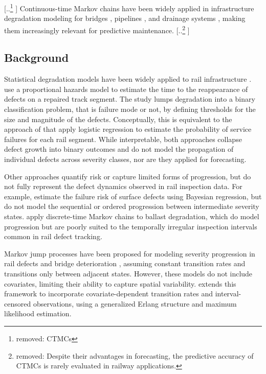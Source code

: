 \documentclass{article}
\providecommand{\DIFadd}[1]{{\protect\color{blue} \sf #1}} %
\providecommand{\DIFdel}[1]{{\protect\color{red} [..\footnote{removed: #1} ]}} %
\providecommand{\DIFaddbegin}{} %
\providecommand{\DIFaddend}{} %
\providecommand{\DIFdelbegin}{} %
\providecommand{\DIFdelend}{} %
\begin{document}
\DIFdelbegin \DIFdel{CTMCs }\DIFdelend \DIFaddbegin \DIFadd{Continuous-time Markov chains }\DIFaddend have been widely applied in infrastructure degradation modeling for bridges \citep{Mizutani2023RegimeSwitching}, pipelines \citep{JimenezRoa2024Nonhomogeneous}, and drainage systems \citep{Wu2021ConditionPrediction}, making them increasingly relevant for predictive maintenance. \DIFdelbegin \DIFdel{Despite their advantages in forecasting, the predictive accuracy of CTMCs is rarely evaluated in railway applications. 
}\DIFdelend %

\subsection{Background} \label{sec:background}%
Statistical degradation models have been widely applied to rail infrastructure \citep{Davari2021AIndustry}.
\citet{ghofrani2019a} use a proportional hazards model to estimate the time to the reappearance of defects on a repaired track segment. The study lumps degradation into a binary classification problem, that is failure mode or not, by defining thresholds for the size and magnitude of the defects. Conceptually, this is equivalent to the approach of \citet{dick2003a} that apply logistic regression to estimate the probability of service failures for each rail segment. While interpretable, both approaches collapse defect growth into binary outcomes and do not model the propagation of individual defects across severity classes, nor are they applied for forecasting.

Other approaches quantify risk or capture limited forms of progression, but do not fully represent the defect dynamics observed in rail inspection data. For example, \citet{jamshidi2016a} estimate the failure risk of surface defects using Bayesian regression, but do not model the sequential or ordered progression between intermediate severity states. \citet{bressi2021a} apply discrete-time Markov chains to ballast degradation, which do model progression but are poorly suited to the temporally irregular inspection intervals common in rail defect tracking.

Markov jump processes have been proposed for modeling severity progression in rail defects \citep{podofillini2006a} and bridge deterioration \citep{sun2024a}, assuming constant transition rates and transitions only between adjacent states. However, these models do not include covariates, limiting their ability to capture spatial variability. \citet{bisgaard2024A} extends this framework to incorporate covariate-dependent transition rates and interval-censored observations, using a generalized Erlang structure and maximum likelihood estimation.
\end{document}
